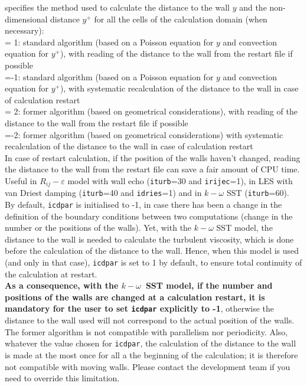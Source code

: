{specifies the method used to calculate the distance to the wall $y$ and the
non-dimensional distance $y^+$ for all the
cells of the calculation domain (when necessary):\\
\hspace*{1.3cm}= 1: standard algorithm (based on a Poisson equation for $y$ and
convection equation for $y^+$),
with reading of the distance to the wall from the restart file
if possible\\
\hspace*{1.3cm}=-1: standard algorithm (based on a Poisson equation for $y$ and
convection equation for $y^+$),
with systematic recalculation of the distance to the wall in case of
calculation restart\\
\hspace*{1.3cm}= 2: former algorithm (based on geometrical
considerations),
with reading of the distance to the wall from the restart file
if possible\\
\hspace*{1.3cm}=-2: former algorithm (based on geometrical
considerations) with systematic recalculation of the distance to the
wall in case of calculation restart\\
In case of restart calculation, if the position of the walls haven't changed,
reading the distance to the wall from the restart file can save a fair amount of
CPU time.\\
Useful in $R_{ij}-\varepsilon$ model with wall echo ({\tt iturb}=30 and
{\tt irijec}=1), in LES with van Driest damping ({\tt iturb}=40 and
{\tt idries}=1) and in $k-\omega$ SST ({\tt iturb}=60). \\
By default, {\tt icdpar} is initialised to -1, in case there has been a change in the
definition of the boundary conditions between two computations (change in the
number or the positions of the walls). Yet, with the $k-\omega$ SST model, the
distance to the wall is needed to calculate the turbulent viscosity, which is
done before the calculation of the distance to the wall. Hence, when this model
is used (and only in that case), {\tt icdpar} is set to 1 by default, to ensure total
continuity of the calculation at restart.\\
{\bf As a consequence, with the \boldmath$k-\omega$\unboldmath\ SST model, if
the number and positions of the walls are changed at a calculation restart, it
is mandatory for the user to set {\tt icdpar} explicitly to -1}, otherwise the
distance to the wall used will not correspond to the actual position of the
walls.\\
The former algorithm is not compatible with parallelism nor periodicity. Also,
whatever the value chosen for {\tt icdpar}, the calculation of the distance to the
wall is made at the most once for all a the beginning of the calculation; it is
therefore not compatible with moving walls. Please contact the development team
if you need to override this limitation.}


